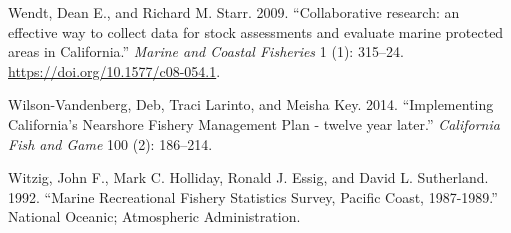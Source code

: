 \documentclass[11pt,
  english,
  a4paper,
]{article}
\newlength{\cslhangindent}
\newenvironment{CSLReferences}[2] %
 {%
  \setlength{\parindent}{0pt}
  \ifodd #1 \everypar{\setlength{\hangindent}{\cslhangindent}}\ignorespaces\fi
  \ifnum #2 > 0
  \setlength{\parskip}{#2\baselineskip}
  \fi
 }%
 {}
\begin{document}
\begin{CSLReferences}{1}{0}
\leavevmode{}%
Wendt, Dean E., and Richard M. Starr. 2009. {``{Collaborative research: an effective way to collect data for stock assessments and evaluate marine protected areas in California}.''} \emph{Marine and Coastal Fisheries} 1 (1): 315--24. \url{https://doi.org/10.1577/c08-054.1}.

\leavevmode{}%
Wilson-Vandenberg, Deb, Traci Larinto, and Meisha Key. 2014. {``{Implementing California's Nearshore Fishery Management Plan - twelve year later}.''} \emph{California Fish and Game} 100 (2): 186--214.

\leavevmode{}%
Witzig, John F., Mark C. Holliday, Ronald J. Essig, and David L. Sutherland. 1992. {``{Marine Recreational Fishery Statistics Survey, Pacific Coast, 1987-1989}.''} National Oceanic; Atmospheric Administration.

\end{CSLReferences}
\end{document}
